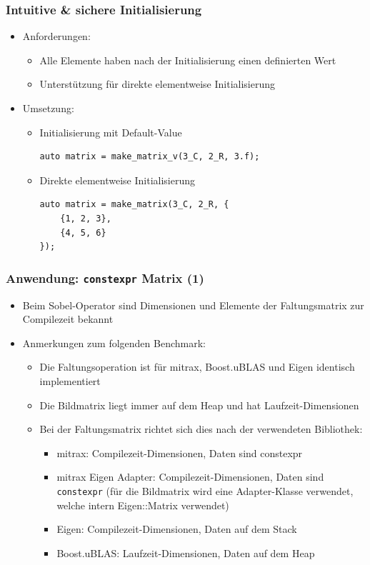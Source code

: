 \documentclass{beamer}
\begin{document}
\begin{frame}[fragile]
    \frametitle{Intuitive \& sichere Initialisierung}
    \begin{itemize}
        \item Anforderungen:
        \begin{itemize}
            \item Alle Elemente haben nach der Initialisierung einen definierten Wert
            \item Unterstützung für direkte elementweise Initialisierung
        \end{itemize}
    \item Umsetzung:
    \begin{itemize}
        \item Initialisierung mit Default-Value
\begin{verbatim}
auto matrix = make_matrix_v(3_C, 2_R, 3.f);
\end{verbatim}
        \item Direkte elementweise Initialisierung
\begin{verbatim}
auto matrix = make_matrix(3_C, 2_R, {
    {1, 2, 3},
    {4, 5, 6}
});
\end{verbatim}
\end{itemize}
\end{itemize}
\end{frame}
\begin{frame}
    \frametitle{Anwendung: \texttt{constexpr} Matrix (1)}
    \begin{itemize}
        \item Beim Sobel-Operator sind Dimensionen und Elemente der Faltungsmatrix zur Compilezeit bekannt
        \item Anmerkungen zum folgenden Benchmark:
        \begin{itemize}
            \item Die Faltungsoperation ist für mitrax, Boost.uBLAS und Eigen identisch implementiert
            \item Die Bildmatrix liegt immer auf dem Heap und hat Laufzeit-Dimensionen
            \item Bei der Faltungsmatrix richtet sich dies nach der verwendeten Bibliothek:
            \begin{itemize}
                \item mitrax: Compilezeit-Dimensionen, Daten sind constexpr
                \item mitrax Eigen Adapter: Compilezeit-Dimensionen, Daten sind \texttt{constexpr}
                    (für die Bildmatrix wird eine Adapter-Klasse verwendet, welche intern Eigen::Matrix verwendet)
                \item Eigen: Compilezeit-Dimensionen, Daten auf dem Stack
                \item Boost.uBLAS: Laufzeit-Dimensionen, Daten auf dem Heap
            \end{itemize}
        \end{itemize}
    \end{itemize}
\end{frame}
\end{document}
